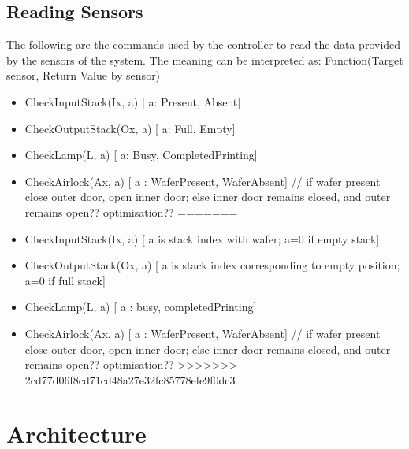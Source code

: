 \documentclass[a4paper,12pt]{article}
\begin{document}
\subsection {Reading Sensors}
The following are the commands used by the controller to read the data provided by the sensors of the system. The meaning can be interpreted as:
Function(Target sensor, Return Value by sensor)
\begin{itemize}
<<<<<<< HEAD
\item CheckInputStack(Ix, a)              [ a: Present, Absent] 
\item CheckOutputStack(Ox, a)          [ a: Full, Empty]
\item CheckLamp(L, a)	                  [ a: Busy, CompletedPrinting]	
\item CheckAirlock(Ax, a)                    [ a : WaferPresent, WaferAbsent]  // if wafer present close outer door, open inner door; 												   else inner door remains closed, and outer remains 													   open?? optimisation?? 
=======
\item CheckInputStack(Ix, a)              [ a is stack index with wafer; a=0 if empty stack] 
\item CheckOutputStack(Ox, a)          [ a is stack index corresponding to empty position; a=0 if full stack]
\item CheckLamp(L, a)	                  [ a : busy, completedPrinting]	
\item CheckAirlock(Ax, a)                    [ a : WaferPresent, WaferAbsent]  // if wafer present close outer door, open inner door; else inner door remains closed, and outer remains open?? optimisation?? 
>>>>>>> 2cd77d06f8cd71cd48a27e32fc85778efe9f0dc3
\end{itemize}

\section{Architecture}
\end{document}
